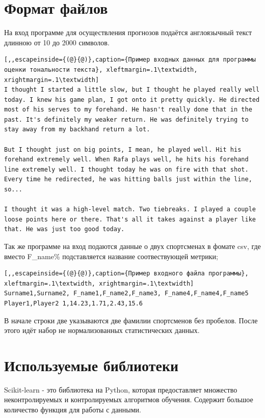 \section{Формат файлов}
На вход программе для осуществления прогнозов подаётся англоязычный текст длинною от 10 до 2000 символов.
\begin{lstlisting}[,,escapeinside={(@}{@)},caption={Пример входных данных для программы оценки тональности текста}, xleftmargin=.1\textwidth, xrightmargin=.1\textwidth] 
I thought I started a little slow, but I thought he played really well today. I knew his game plan, I got onto it pretty quickly. He directed most of his serves to my forehand. He hasn't really done that in the past. It's definitely my weaker return. He was definitely trying to stay away from my backhand return a lot.

But I thought just on big points, I mean, he played well. Hit his forehand extremely well. When Rafa plays well, he hits his forehand line extremely well. I thought today he was on fire with that shot. Every time he redirected, he was hitting balls just within the line, so...

I thought it was a high-level match. Two tiebreaks. I played a couple loose points here or there. That's all it takes against a player like that. He was just too good today.
\end{lstlisting}

Так же программе на вход подаются данные о двух спортсменах в фомате csv,
где вместо F\_name\% подставляется название соотвествующей метрики;
\begin{lstlisting}[,,escapeinside={(@}{@)},caption={Пример входного файла программы}, xleftmargin=.1\textwidth, xrightmargin=.1\textwidth] 
Surname1,Surname2, F_name1,F_name2,F_name3, F_name4,F_name4,F_name5
Player1,Player2 1,14.23,1.71,2.43,15.6

\end{lstlisting}
В начале строки две указываются две фамилии спортсменов без пробелов. После этого идёт набор не нормализованных статистических данных.

\section{Используемые библиотеки}

Scikit-learn - это библиотека на Python, которая предоставляет множество неконтролируемых и контролируемых алгоритмов обучения. Содержит большое количество функция для работы  с данными.

